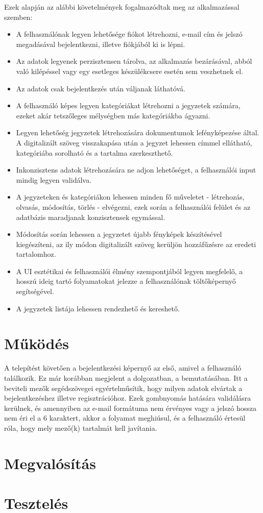 Ezek alapján az alábbi követelmények fogalmazódtak meg az alkalmazással szemben:
\begin{itemize}
	\item A felhasználónak legyen lehetősége fiókot létrehozni, e-mail cím és jelszó megadásával bejelentkezni, illetve fiókjából ki is lépni.
	\item Az adatok legyenek perzisztensen tárolva, az alkalmazás bezárásával, abból való kilépéssel vagy egy esetleges készülékcsere esetén sem veszhetnek el.
	\item Az adatok csak bejelentkezés után váljanak láthatóvá.
	\item A felhasználó képes legyen kategóriákat létrehozni a jegyzetek számára, ezeket akár tetszőleges mélységben más kategóriákba ágyazni.
	\item Legyen lehetőség jegyzetek létrehozására dokumentumok lefényképezése által. A digitalizált szöveg visszakapása után a jegyzet lehessen címmel ellátható, kategóriába sorolható és a tartalma szerkeszthető.
	\item Inkonzisztens adatok létrehozására ne adjon lehetőséget, a felhasználói input mindig legyen validálva.
	\item A jegyzeteken és kategóriákon lehessen minden fő műveletet - létrehozás, olvasás, módosítás, törlés - elvégezni, ezek során a felhasználói felület és az adatbázis maradjanak konzisztensek egymással.
	\item Módosítás során lehessen a jegyzetet újabb fényképek készítésével kiegészíteni, az ily módon digitalizált szöveg kerüljön hozzáfűzésre az eredeti tartalomhoz.
	\item A UI esztétikai és felhasználói élmény szempontjából legyen megfelelő, a hosszú ideig tartó folyamatokat jelezze a felhasználónak töltőképernyő segítségével. 
	\item A jegyzetek listája lehessen rendezhető és kereshető. 
\end{itemize}

\section{Működés}

A telepítést követően a bejelentkezési képernyő az első, amivel a felhasználó találkozik. Ez már korábban megjelent a dolgozatban, a  bemutatásában. Itt a beviteli mezők segédszövegei egyértelműsítik, hogy milyen adatok elvártak a bejelentkezéshez illetve regisztrációhoz. Ezek gombnyomás hatására validálásra kerülnek, és amennyiben az e-mail formátuma nem érvényes vagy a jelszó hossza nem éri el a 6 karaktert, akkor a folyamat meghiúsul, és a felhasználó értesül róla, hogy mely mező(k) tartalmát kell javítania. 



\section{Megvalósítás}

\section{Tesztelés}